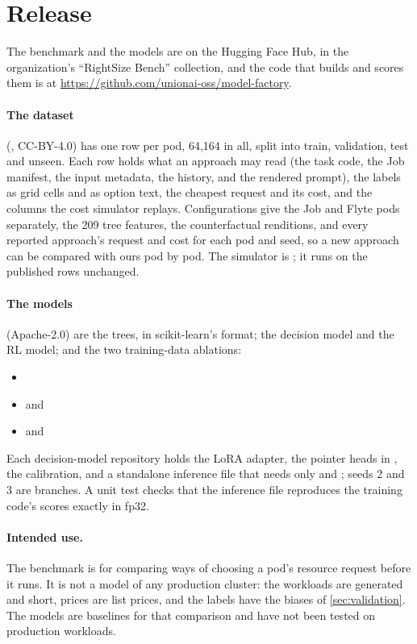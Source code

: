 \section{Release}
\label{sec:release}

The benchmark and the models are on the Hugging Face Hub, in the  organization's ``RightSize Bench''
collection, and the code that builds and scores them is at
\url{https://github.com/unionai-oss/model-factory}.

\paragraph{The dataset} (, CC-BY-4.0) has one row per pod, 64,164 in all, split into
train, validation, test and unseen. Each row holds what an approach may read (the task code, the Job manifest, the
input metadata, the history, and the rendered prompt), the labels as grid cells and as option text, the cheapest
request and its cost, and the columns the cost simulator replays. Configurations give the Job and Flyte pods
separately, the 209 tree features, the counterfactual renditions, and every reported approach's request and cost
for each pod and seed, so a new approach can be compared with ours pod by pod. The simulator is
; it runs on the published rows unchanged.

\paragraph{The models} (Apache-2.0) are the trees, in scikit-learn's  format; the decision model and
the RL model; and the two training-data ablations:
\begin{itemize}
  \item {}
  \item {} and 
  \item {} and 
\end{itemize} Each decision-model repository holds
the LoRA adapter, the pointer heads in , the calibration, and a standalone inference file
that needs only  and ; seeds 2 and 3 are branches. A unit test checks that the
inference file reproduces the training code's scores exactly in fp32.

\paragraph{Intended use.} The benchmark is for comparing ways of choosing a pod's resource request before it runs.
It is not a model of any production cluster: the workloads are generated and short, prices are list prices, and the
labels have the biases of \cref{sec:validation}. The models are baselines for that comparison and have not been
tested on production workloads.

